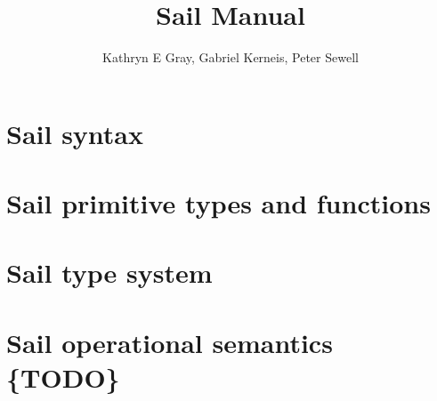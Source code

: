 \documentclass[11pt]{article}
\begin{document}


\title{Sail Manual}
\author{Kathryn E Gray, Gabriel Kerneis, Peter Sewell}

\maketitle

\tableofcontents

\newpage

\section{Sail syntax}

\ottgrammartabular{
\ottl\ottinterrule
\ottannot\ottinterrule
\ottid\ottinterrule
\ottkid\ottinterrule
\ottbaseXXkind\ottinterrule
\ottkind\ottinterrule
\ottnexp\ottinterrule
\ottorder\ottinterrule
\ottbaseXXeffect\ottinterrule
\otteffect\ottinterrule
\otttyp\ottinterrule
\otttypXXarg\ottinterrule
\ottnXXconstraint\ottinterrule
\ottkindedXXid\ottinterrule
\ottquantXXitem\ottinterrule
\otttypquant\ottinterrule
\otttypschm\ottinterrule
\ottnameXXscmXXopt\ottinterrule
\otttypeXXdef\ottinterrule
\otttypeXXunion\ottinterrule
\ottindexXXrange\ottinterrule
\ottlit\ottinterrule
\ottsemiXXopt\ottinterrule
\ottpat\ottinterrule
\ottfpat\ottinterrule
\ottexp\ottinterrule
\ottlexp\ottinterrule
\ottfexp\ottinterrule
\ottfexps\ottinterrule
\ottoptXXdefault\ottinterrule
\ottpexp\ottinterrule
\otttannotXXopt\ottinterrule
\ottrecXXopt\ottinterrule
\otteffectXXopt\ottinterrule
\ottfuncl\ottinterrule
\ottfundef\ottinterrule
\ottletbind\ottinterrule
\ottvalXXspec\ottinterrule
\ottdefaultXXspec\ottinterrule
\ottscatteredXXdef\ottinterrule
\ottregXXid\ottinterrule
\ottaliasXXspec\ottinterrule
\ottdecXXspec\ottinterrule
\ottdef\ottinterrule
\ottdefs\ottinterrule}

\newpage
\section{Sail primitive types and functions}

\ottgrammartabular{
\ottbuiltXXinXXtypes\ottinterrule}

\ottgrammartabular{
\ottbuiltXXinXXtypeXXabbreviations\ottinterrule
\ottfunctions\ottinterrule
\ottfunctionsXXwithXXcoercions\ottinterrule}

\section{Sail type system}

\section{Sail operational semantics \{TODO\}}
\end{document}
